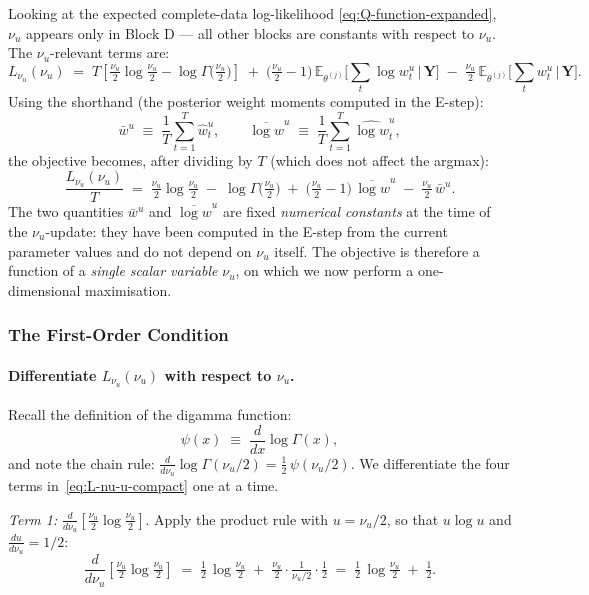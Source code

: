 \documentclass[11pt, a4paper, oneside]{article}
\newcommand{\mY}{\mathbf{Y}}
\begin{document}
Looking at the expected complete-data log-likelihood
\eqref{eq:Q-function-expanded}, $\nu_u$ appears only in Block D — all
other blocks are constants with respect to $\nu_u$. The $\nu_u$-relevant
terms are:
\begin{equation}
L_{\nu_u}(\nu_u) \;=\;
T\!\left[\tfrac{\nu_u}{2}\log\!\tfrac{\nu_u}{2} - \log \Gamma\!\big(\tfrac{\nu_u}{2}\big)\right]
\;+\; \big(\tfrac{\nu_u}{2} - 1\big)\,\mathbb{E}_{\theta^{(j)}}\!\big[\sum_t \log w^u_t \,\big|\, \mY\big]
\;-\; \tfrac{\nu_u}{2}\,\mathbb{E}_{\theta^{(j)}}\!\big[\sum_t w^u_t \,\big|\, \mY\big].
\label{eq:L-nu-u}
\end{equation}
Using the shorthand (the posterior weight moments computed in the
E-step):
\[
\bar{w}^u \;\equiv\; \frac{1}{T}\sum_{t=1}^T \hat{w}^u_t,
\qquad
\overline{\log w}^u \;\equiv\; \frac{1}{T}\sum_{t=1}^T \widehat{\log w}^u_t,
\]
the objective becomes, after dividing by $T$ (which does not affect the
argmax):
\begin{equation}
\frac{L_{\nu_u}(\nu_u)}{T} \;=\;
\tfrac{\nu_u}{2}\log\!\tfrac{\nu_u}{2} \;-\; \log \Gamma\!\big(\tfrac{\nu_u}{2}\big)
\;+\; \big(\tfrac{\nu_u}{2} - 1\big)\, \overline{\log w}^u
\;-\; \tfrac{\nu_u}{2}\, \bar{w}^u.
\label{eq:L-nu-u-compact}
\end{equation}
The two quantities $\bar{w}^u$ and $\overline{\log w}^u$ are fixed
\emph{numerical constants} at the time of the $\nu_u$-update: they
have been computed in the E-step from the current parameter values and
do not depend on $\nu_u$ itself. The objective is therefore a function
of a \emph{single scalar variable} $\nu_u$, on which we now perform a
one-dimensional maximisation.

\subsubsection{The First-Order Condition}

\paragraph{Differentiate $L_{\nu_u}(\nu_u)$ with respect to $\nu_u$.}
Recall the definition of the digamma function:
\[
\psi(x) \;\equiv\; \frac{d}{dx}\log \Gamma(x),
\]
and note the chain rule: $\frac{d}{d\nu_u}\log\Gamma(\nu_u/2) = \tfrac{1}{2}\,\psi(\nu_u/2)$.
We differentiate the four terms in~\eqref{eq:L-nu-u-compact} one at a
time.

\emph{Term 1:} $\frac{d}{d\nu_u}\!\left[\tfrac{\nu_u}{2}\log\!\tfrac{\nu_u}{2}\right]$.
Apply the product rule with $u = \nu_u/2$, so that
$u \log u$ and $\frac{d u}{d\nu_u} = 1/2$:
\[
\frac{d}{d\nu_u}\!\left[\tfrac{\nu_u}{2}\log\!\tfrac{\nu_u}{2}\right]
\;=\; \tfrac{1}{2}\,\log\!\tfrac{\nu_u}{2} \;+\; \tfrac{\nu_u}{2}\cdot \tfrac{1}{\nu_u/2}\cdot \tfrac{1}{2}
\;=\; \tfrac{1}{2}\,\log\!\tfrac{\nu_u}{2} \;+\; \tfrac{1}{2}.
\]
\end{document}
